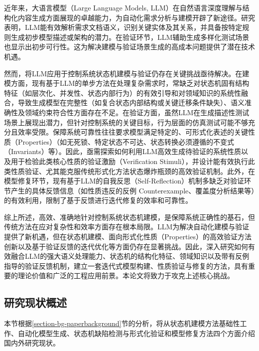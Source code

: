 近年来，大语言模型（Large Language Models, LLM）在自然语言深度理解与结构化内容生成方面展现的卓越能力，为自动化需求分析与建模开辟了新途径。研究表明，LLM能有效解析需求文档语义，识别关键实体及其关系，并具备按特定规则生成初步模型描述或架构的潜力。在验证环节，LLM辅助生成多样化测试场景也显示出初步可行性。这为解决建模与验证场景生成的高成本问题提供了潜在技术机遇。

然而，将LLM应用于控制系统状态机建模与验证仍存在关键挑战亟待解决。在建模方面，现有基于LLM的单步方法在处理复杂需求时，常缺乏对状态机固有结构特征（如层次化、并发性、状态内部行为）的有效引导和对领域知识的系统性融合，导致生成模型在完整性（如复合状态内部结构或关键迁移条件缺失）、语义准确性及领域约束符合性方面存在不足。在验证方面，虽然LLM在生成描述性测试场景上展现出潜力，但针对控制系统的关键目标，行为层面的仿真测试可能不够充分且效率受限。保障系统可靠性往往要求模型满足特定的、可形式化表述的关键性质（Properties）（如无死锁、特定状态不可达、状态转换必须遵循的不变式（Invariants）等）。因此，亟需探索如何利用LLM高效生成待验证的系统性质以及用于检验此类核心性质的验证激励（Verification Stimuli），并设计能有效执行此类性质验证、尤其能克服传统形式化方法状态爆炸瓶颈的高效验证机制。此外，在模型修复环节，现有基于LLM的自我反思（Self-Reflection）机制多缺乏对验证环节产生的具体反馈信息（如性质违反的反例 Counterexample、覆盖度分析结果等）的有效利用，限制了基于反馈进行迭代修复的效率和可靠性。

综上所述，高效、准确地针对控制系统状态机建模，是保障系统正确性的基石，但传统方法在应对复杂性和效率方面存在根本局限。LLM为解决自动化建模与验证提供了新机遇，但在状态机建模、面向形式化性质（Properties）的高效验证方法创新以及基于验证反馈的迭代优化等方面仍存在显著挑战。因此，深入研究如何有效融合LLM的强大语义处理能力、状态机的结构化特征、领域知识以及带有反例指导的验证反馈机制，建立一套迭代式模型构建、性质验证与修复的方法，具有重要的理论价值和广泛的工程应用前景。本论文将致力于攻克上述核心挑战。

\subsection{研究现状概述}
\label{section-bg-current}

本节根据\ref{section-bg-paperbackground}节的分析，将从状态机建模方法基础性工作、自动化模型生成、状态机缺陷检测与形式化验证和模型修复方法四个方面介绍国内外研究现状。

